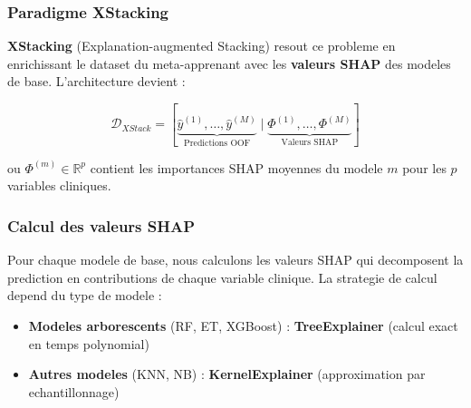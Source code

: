 \subsubsection{Paradigme XStacking}

\textbf{XStacking} (Explanation-augmented Stacking) resout ce probleme en enrichissant le dataset du meta-apprenant avec les \textbf{valeurs SHAP} des modeles de base. L'architecture devient :

\begin{equation}
    \mathcal{D}_{XStack} = \left[\underbrace{\hat{y}^{(1)}, \ldots, \hat{y}^{(M)}}_{\text{Predictions OOF}} \mid \underbrace{\Phi^{(1)}, \ldots, \Phi^{(M)}}_{\text{Valeurs SHAP}}\right]
\end{equation}

ou $\Phi^{(m)} \in \mathbb{R}^{p}$ contient les importances SHAP moyennes du modele $m$ pour les $p$ variables cliniques.

\subsubsection{Calcul des valeurs SHAP}

Pour chaque modele de base, nous calculons les valeurs SHAP qui decomposent la prediction en contributions de chaque variable clinique. La strategie de calcul depend du type de modele :

\begin{itemize}
    \item \textbf{Modeles arborescents} (RF, ET, XGBoost) : \textbf{TreeExplainer} (calcul exact en temps polynomial)
    \item \textbf{Autres modeles} (KNN, NB) : \textbf{KernelExplainer} (approximation par echantillonnage)
\end{itemize}

